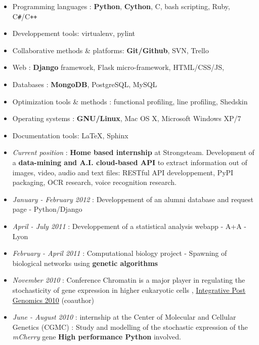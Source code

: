 
\begin{itemize}
\renewcommand{\labelitemi}{$\circ$}
    \item Programming languages : \textbf{Python}, \textbf{Cython}, C, bash scripting, Ruby, C\texttt{\#}/C\texttt{++}
    \item Developpement tools: virtualenv, pylint    
    \item Collaborative methods \& platforms: \textbf{Git/Github}, SVN, Trello
    \item Web : \textbf{Django} framework, Flask micro-framework, HTML/CSS/JS, 
    \item Databases : \textbf{MongoDB}, PostgreSQL, MySQL
    \item Optimization tools \& methods : functional profiling, line profiling, Shedskin
    \item Operating systems : \textbf{GNU/Linux}, Mac OS X, Microsoft Windows XP/7
    \item Documentation tools: \LaTeX, Sphinx
\end{itemize}

\begin{itemize}
\renewcommand{\labelitemi}{$\circ$}
	\item \emph{Current position} : \textbf{Home based internship} at Strongsteam. Development of a \textbf{data-mining and A.I. cloud-based API} to extract information out of images, video, audio and text files: RESTful API developpement, PyPI packaging, OCR research, voice recognition research.
	\item \emph{January - February 2012} : Developpement of an alumni database and request page - Python/Django
	\item \emph{April - July 2011} : Developpement of a statistical analysis webapp - A+A - Lyon
	\item \textit{February - April 2011} : Computational biology project - Spawning of biological networks using \textbf{genetic algorithms}
    \item \textit{November 2010} : Conference \og Chromatin is a major player in regulating the stochasticity of gene expression in higher eukaryotic cells \fg{}, \href{http://ipg.insa-lyon.fr/}{Integrative Post Genomics 2010} (coauthor)
    \item \textit{June - August 2010} : internship at the Center of Molecular and Cellular Genetics (CGMC) : \og Study and modelling of the stochastic expression of the \textit{mCherry} gene\fg{} \textbf{High performance Python }involved.
\end{itemize}

